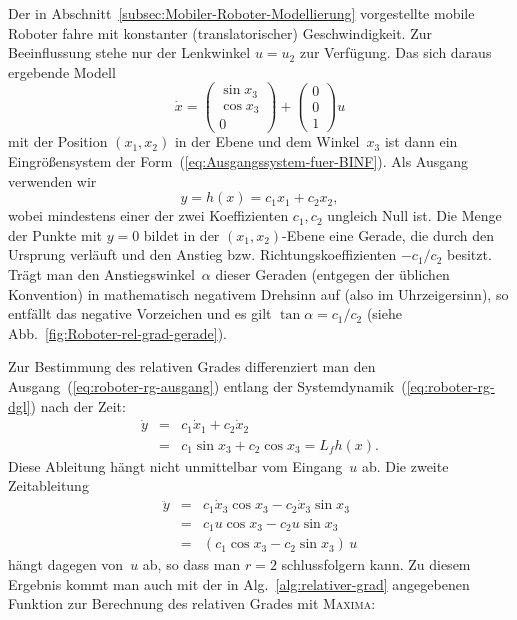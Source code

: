\begin{example}
\label{exa:Roboter-rel-grad}Der in Abschnitt~\ref{subsec:Mobiler-Roboter-Modellierung}
vorgestellte mobile Roboter fahre mit konstanter (translatorischer)
Geschwindigkeit. Zur Beeinflussung stehe nur der Lenkwinkel $u=u_{2}$
zur Verfügung. Das sich daraus ergebende Modell 
\begin{equation}
\dot{x}=\left(\begin{array}{c}
\sin x_{3}\\
\cos x_{3}\\
0
\end{array}\right)+\left(\begin{array}{c}
0\\
0\\
1
\end{array}\right)u\label{eq:roboter-rg-dgl}
\end{equation}
mit der Position $(x_{1},x_{2})$ in der Ebene und dem Winkel~$x_{3}$
ist dann ein Eingrößensystem der Form~(\ref{eq:Ausgangssystem-fuer-BINF}).
Als Ausgang verwenden wir 
\begin{equation}
y=h(x)=c_{1}x_{1}+c_{2}x_{2},\label{eq:roboter-rg-ausgang}
\end{equation}
wobei mindestens einer der zwei Koeffizienten $c_{1},c_{2}$ ungleich
Null ist. Die Menge der Punkte mit $y=0$ bildet in der $(x_{1},x_{2})$-Ebene
eine Gerade, die durch den Ursprung verläuft und den Anstieg bzw.
Richtungskoeffizienten $-c_{1}/c_{2}$ besitzt. Trägt man den Anstiegswinkel~$\alpha$
dieser Geraden (entgegen der üblichen Konvention) in mathematisch
negativem Drehsinn auf (also im Uhrzeigersinn), so entfällt das negative
Vorzeichen und es gilt $\tan\alpha=c_{1}/c_{2}$ (siehe Abb.~\ref{fig:Roboter-rel-grad-gerade}).

Zur Bestimmung des relativen Grades differenziert man den Ausgang~(\ref{eq:roboter-rg-ausgang})
entlang der Systemdynamik~(\ref{eq:roboter-rg-dgl}) nach der Zeit:
\begin{eqnarray*}
\dot{y} & = & c_{1}\dot{x}_{1}+c_{2}\dot{x}_{2}\\
 & = & c_{1}\sin x_{3}+c_{2}\cos x_{3}=L_{f}h(x).
\end{eqnarray*}
Diese Ableitung hängt nicht unmittelbar vom Eingang~$u$ ab. Die
zweite Zeit\-ableitung 
\begin{eqnarray*}
\ddot{y} & = & c_{1}\dot{x}_{3}\cos x_{3}-c_{2}\dot{x}_{3}\sin x_{3}\\
 & = & c_{1}u\cos x_{3}-c_{2}u\sin x_{3}\\
 & = & (c_{1}\cos x_{3}-c_{2}\sin x_{3})\,u
\end{eqnarray*}
hängt dagegen von~$u$ ab, so dass man $r=2$ schlussfolgern kann.
Zu diesem Ergebnis kommt man auch mit der in Alg.~\ref{alg:relativer-grad}
angegebenen Funktion zur Berechnung des relativen Grades mit \textsc{Maxima}:


\end{example}

